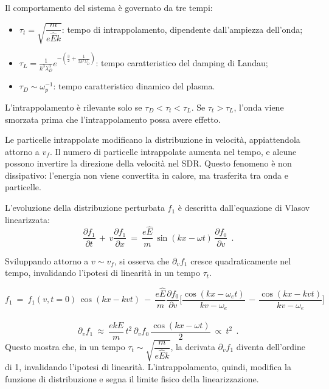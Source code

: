 Il comportamento del sistema è governato da tre tempi:
\begin{itemize}
	\item \(\tau_t = \sqrt{\dfrac{m}{e\hat{E}k}}\): tempo di intrappolamento, dipendente dall'ampiezza dell'onda;
	\item \(\tau_L= \displaystyle\frac{1}{k^3\lambda_D^3}e^{-(\frac{3}{2}+\frac{1}{2k^2\lambda_D^2})}\): tempo caratteristico del damping di Landau;
	\item \(\tau_D \sim \omega_p^{-1}\): tempo caratteristico dinamico del plasma.
\end{itemize}
L'intrappolamento è rilevante solo se \(\tau_D < \tau_t < \tau_L\). Se \(\tau_t > \tau_L\), l'onda viene smorzata prima che l'intrappolamento possa avere effetto.
	
Le particelle intrappolate modificano la distribuzione in velocità, appiattendola attorno a \(v_f\). Il numero di particelle intrappolate aumenta nel tempo, e alcune possono invertire la direzione della velocità nel SDR. Questo fenomeno è non dissipativo: l'energia non viene convertita in calore, ma trasferita tra onda e particelle.
	
L'evoluzione della distribuzione perturbata \(f_1\) è descritta dall'equazione di Vlasov linearizzata:
\[
\frac{\partial f_1}{\partial t}\, +\, v \frac{\partial f_1}{\partial x}\ =\ \frac{e\hat{E}}{m}\, \sin(kx - \omega t)\, \frac{\partial f_0}{\partial v}\ \ .
\]

Sviluppando attorno a \(v \sim v_f\), si osserva che \(\partial_v f_1\) cresce quadraticamente nel tempo, invalidando l'ipotesi di linearità in un tempo \(\tau_t\).

\[f_1\ =\ f_1(v,t=0)\,\cos(kx-kvt)\ -\ \frac{e\hat E}m\frac{\partial f_0}{\partial v}\bigg[ \frac{\cos(kx-\omega _e t)}{kv-\omega_e}\, -\, \frac{\cos(kx-kv t)}{kv-\omega_e}\bigg]\] 

\[
\partial_v f_1\ \approx\ \frac{ek\hat{E}}{m}\, t^2\, \partial_v f_0\, \frac{\cos(kx - \omega t)}{2}\ \propto\ t^2\ \ .
\]
Questo mostra che, in un tempo \(\tau_t \sim \sqrt{\dfrac{m}{e\hat{E}k}}\), la derivata \(\partial_v f_1\) diventa dell'ordine di 1, invalidando l'ipotesi di linearità. L'intrappolamento, quindi, modifica la funzione di distribuzione e segna il limite fisico della linearizzazione.
 



%
%

